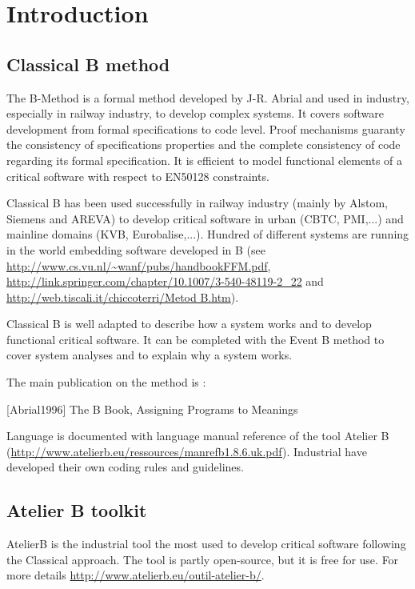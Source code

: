 \section{Introduction}

\subsection{Classical B method}
The B-Method is a formal method developed by J-R. Abrial and used in industry, especially in railway industry, to develop complex systems. It covers software development from formal specifications to code level. Proof mechanisms guaranty the consistency of specifications properties and the complete consistency of code regarding its formal specification. It is efficient to model  functional  elements of a critical software with respect to  EN50128 constraints.

Classical B has been used successfully  in railway  industry (mainly by Alstom, Siemens and AREVA) to  develop critical software in urban (CBTC, PMI,...) and mainline domains (KVB, Eurobalise,...). Hundred of different systems are running in the world embedding software developed in B (see \url{http://www.cs.vu.nl/~wanf/pubs/handbookFFM.pdf}, \url{http://link.springer.com/chapter/10.1007/3-540-48119-2_22} and \url{http://web.tiscali.it/chiccoterri/Metod B.htm}).


Classical B  is well adapted to describe how a system works and to develop functional  critical software. It can be completed with the Event B method to cover system analyses and to explain why a system works.

The main publication on the method is :

[Abrial1996] The B Book, Assigning Programs to Meanings


Language is documented with language manual reference of the tool Atelier B (\url{http://www.atelierb.eu/ressources/manrefb1.8.6.uk.pdf}). Industrial have developed their own coding rules and guidelines.



\subsection{Atelier B toolkit}

AtelierB is the industrial  tool the most used to develop critical software following the Classical approach.
The tool is partly open-source, but it is free for use.
For more details \url{http://www.atelierb.eu/outil-atelier-b/}.



